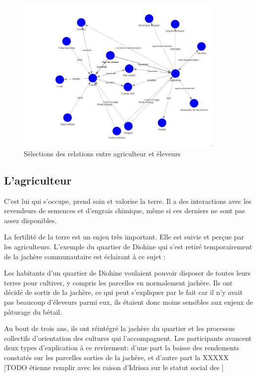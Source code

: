 \begin{figure}
  \begin{center}
    \includegraphics[width=0.9\textwidth]{img/agriculteur_eleveur.png}
  \end{center}
  \caption{Sélections des relations entre agriculteur et éleveurs}
  \label{fig:agripasteur}
\end{figure}

\subsection{L'agriculteur}
C'est lui qui s'occupe, prend soin et valorise la terre. Il a des interactions avec les revendeurs de semences et d'engrais chimique, même si ces derniers ne sont pas assez disponibles.

La fertilité de la terre est un enjeu très important. Elle est suivie et perçue par les agriculteurs. L'exemple du quartier de Diohine qui s'est retiré temporairement de la jachère communautaire est éclairant à ce sujet :

Les habitants d'un quartier de Diohine voulaient pouvoir disposer de toutes leurs terres pour cultiver, y compris les parcelles en normalement jachère. Ils ont décidé de sortir de la jachère, ce qui peut s'expliquer par le fait car il n'y avait pas beaucoup d'éleveurs parmi eux, ils étaient donc moins sensibles aux enjeux de pâturage du bétail.

Au bout de trois ans, ils ont réintégré la jachère du quartier et les processus collectifs d'orientation des cultures qui l'accompagnent.
Les participants avancent deux types d'explication à ce revirement: d'une part la baisse des rendements constatés sur les parcelles sorties de la jachère, et d'autre part la XXXXX [TODO étienne remplir avec les raison d'Idrissa sur le statut social des ]


